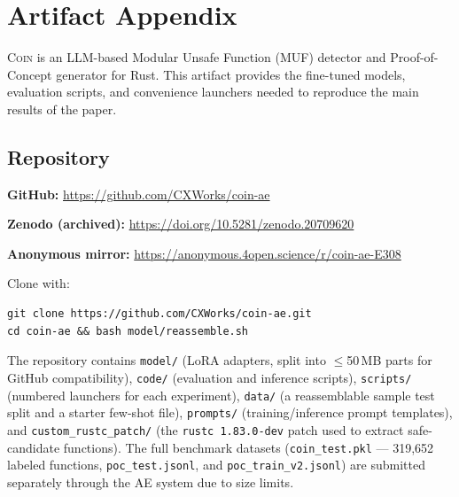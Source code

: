 \documentclass[nonacm,sigconf]{acmart}
\begin{document}

\appendix

\section{Artifact Appendix}

\textsc{Coin} is an LLM-based Modular Unsafe Function (MUF) detector and
Proof-of-Concept generator for Rust. This artifact provides the
fine-tuned models, evaluation scripts, and convenience launchers needed
to reproduce the main results of the paper.


\subsection{Repository}

\textbf{GitHub:} \url{https://github.com/CXWorks/coin-ae}

\noindent\textbf{Zenodo (archived):} \url{https://doi.org/10.5281/zenodo.20709620}

\noindent\textbf{Anonymous mirror:} \url{https://anonymous.4open.science/r/coin-ae-E308}

\noindent Clone with:
\begin{verbatim}
git clone https://github.com/CXWorks/coin-ae.git
cd coin-ae && bash model/reassemble.sh
\end{verbatim}

The repository contains
\texttt{model/} (LoRA adapters, split into \(\leq\)50\,MB parts for GitHub
compatibility),
\texttt{code/} (evaluation and inference scripts),
\texttt{scripts/} (numbered launchers for each experiment),
\texttt{data/} (a reassemblable sample test split and a starter few-shot
file), \texttt{prompts/} (training/inference prompt templates), and
\texttt{custom\_rustc\_patch/} (the \texttt{rustc 1.83.0-dev} patch used
to extract safe-candidate functions).
The full benchmark datasets (\texttt{coin\_test.pkl} --- 319,652 labeled
functions, \texttt{poc\_test.jsonl}, and \texttt{poc\_train\_v2.jsonl})
are submitted separately through the AE system due to size limits.

\end{document}
